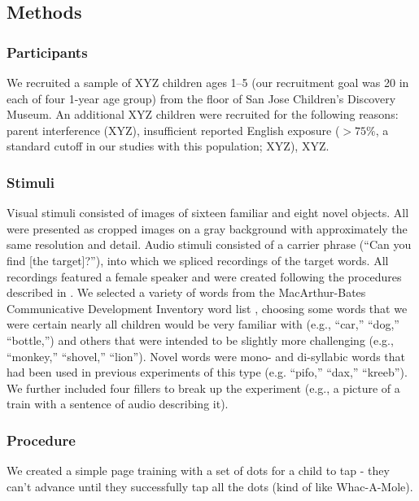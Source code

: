\documentclass[man,noapacite]{apa2}
\begin{document}
\subsection{Methods}

\subsubsection{Participants} 

We recruited a sample of XYZ children ages 1--5 (our recruitment goal was 20 in each of four 1-year age group) from the floor of San Jose Children's Discovery Museum. An additional XYZ children were recruited for the following reasons: parent interference (XYZ), insufficient reported English exposure ($>75\%$, a standard cutoff in our studies with this population; XYZ), XYZ. 

\subsubsection{Stimuli}

Visual stimuli consisted of images of sixteen familiar and eight novel objects. All were presented as cropped images on a gray background with approximately the same resolution and detail.  Audio stimuli consisted of a carrier phrase (``Can you find [the target]?''), into which we spliced recordings of the target words. All recordings featured a female speaker and were created following the procedures described in . We selected a variety of words from the MacArthur-Bates Communicative Development Inventory word list \cite{fenson1994,fenson2007}, choosing some words that we were certain nearly all children would be very familiar with (e.g., ``car,'' ``dog,'' ``bottle,'') and others that were intended to be slightly more challenging (e.g., ``monkey,'' ``shovel,'' ``lion''). Novel words were mono- and di-syllabic words that had been used in previous experiments of this type (e.g. ``pifo,'' ``dax,'' ``kreeb''). We further included four fillers to break up the experiment (e.g., a picture of a train with a sentence of audio describing it).

\subsubsection{Procedure}

We created a simple page training with a set of dots for a child to tap - they can't advance until they successfully tap all the dots (kind of like Whac-A-Mole).
\end{document}
